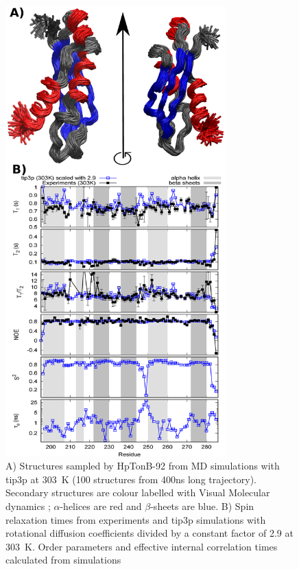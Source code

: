 \documentclass[pre,aps,floatfix,authordate1-4,twocolumn]{revtex4-1}
\begin{document}
\begin{figure}[!h]
  \includegraphics[width=8.5cm]{../Figs/RELdataHpTonB2.eps}%
  \caption{A) Structures sampled by HpTonB-92 from MD simulations with tip3p at 303~K
    (100 structures from 400ns long trajectory). Secondary structures
    are colour labelled with Visual Molecular dynamics \cite{frishman95,humphrey96};
    $\alpha$-helices are red and $\beta$-sheets are blue.
    B) Spin relaxation times from experiments and tip3p
    simulations with rotational diffusion coefficients divided by a
    constant factor of 2.9 at 303~K. Order parameters and effective internal correlation
    times calculated from simulations
    \label{HpTonBrelaxationDATAscaled}}%
\end{figure}
\end{document}
